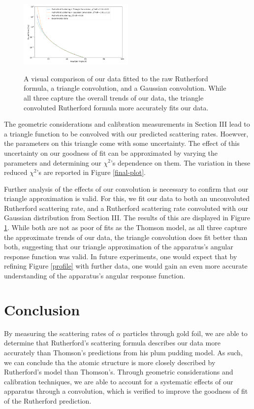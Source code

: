 \begin{figure}[h]
  \includegraphics[width=0.5\textwidth]{gaus.png}
  \label{convdata}
  \caption{A visual comparison of our data fitted to the raw Rutherford formula, a triangle convolution, and a Gaussian convolution. While all three capture the overall trends of our data, the triangle convoluted Rutherford formula more accurately fits our data.}
\end{figure}


The geometric considerations and calibration measurements in Section III lead to a triangle function to be convolved with our predicted scattering rates. Hoewver, the parameters on this triangle come with some uncertainty. The effect of this uncertainty on our goodness of fit can be approximated by varying the parameters and determining our $\chi^2$'s dependence on them. The variation in these reduced $\chi^2$'s are reported in Figure \ref{final-plot}.


Further analysis of the effects of our convolution is necessary to confirm that our triangle approximation is valid. For this, we fit our data to both an unconvoluted Rutherford scattering rate, and a Rutherford scattering rate convoluted with our Gaussian distribution from Section III. The results of this are displayed in Figure \ref{convdata}. While both are not as poor of fits as the Thomson model, as all three capture the approximate trends of our data, the triangle convolution does fit better than both, suggesting that our triangle approximation of the apparatus's angular response function was valid. In future experiments, one would expect that by refining Figure \ref{profile} with further data, one would gain an even more accurate understanding of the apparatus's angular response function.

\section{Conclusion}
By measuring the scattering rates of $\alpha$ particles through gold foil, we are able to determine that Rutherford's scattering formula describes our data more accurately than Thomson's predictions from his plum pudding model. As such, we can conclude tha the atomic structure is more closely described by Rutherford's model than Thomson's. Through geometric considerations and calibration techniques, we are able to account for a systematic effects of our apparatus through a convolution, which is verified to improve the goodness of fit of the Rutherford prediction.

